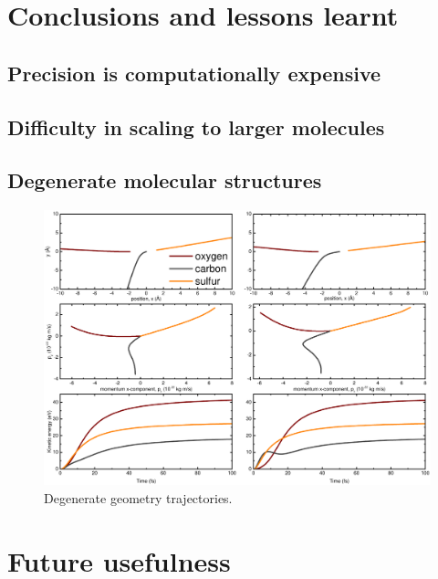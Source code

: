 \section{Conclusions and lessons learnt}
\subsection{Precision is computationally expensive}
\subsection{Difficulty in scaling to larger molecules}

\pagebreak
\subsection{Degenerate molecular structures}


\begin{figure}
  \centering
  \includegraphics[width=\textwidth]{Plots/DegenerateGeometryTrajectories.pdf}
  \caption[Degenerate geometry trajectories.]
  {Degenerate geometry trajectories.}
  \label{fig:DegenerateGeometryTrajectories}
\end{figure}
\clearpage

\section{Future usefulness}

